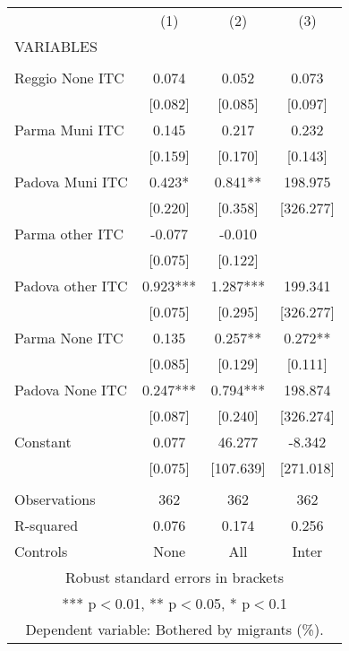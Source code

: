 \begin{tabular}{lccc} \hline
 & (1) & (2) & (3) \\
VARIABLES &  &  &  \\ \hline
 &  &  &  \\
Reggio None ITC & 0.074 & 0.052 & 0.073 \\
 & [0.082] & [0.085] & [0.097] \\
Parma Muni ITC & 0.145 & 0.217 & 0.232 \\
 & [0.159] & [0.170] & [0.143] \\
Padova Muni ITC & 0.423* & 0.841** & 198.975 \\
 & [0.220] & [0.358] & [326.277] \\
Parma other ITC & -0.077 & -0.010 &  \\
 & [0.075] & [0.122] &  \\
Padova other ITC & 0.923*** & 1.287*** & 199.341 \\
 & [0.075] & [0.295] & [326.277] \\
Parma None ITC & 0.135 & 0.257** & 0.272** \\
 & [0.085] & [0.129] & [0.111] \\
Padova None ITC & 0.247*** & 0.794*** & 198.874 \\
 & [0.087] & [0.240] & [326.274] \\
Constant & 0.077 & 46.277 & -8.342 \\
 & [0.075] & [107.639] & [271.018] \\
 &  &  &  \\
Observations & 362 & 362 & 362 \\
R-squared & 0.076 & 0.174 & 0.256 \\
 Controls & None & All & Inter \\ \hline
\multicolumn{4}{c}{ Robust standard errors in brackets} \\
\multicolumn{4}{c}{ *** p$<$0.01, ** p$<$0.05, * p$<$0.1} \\
\multicolumn{4}{c}{ Dependent variable: Bothered by migrants (\%).} \\
\end{tabular}
